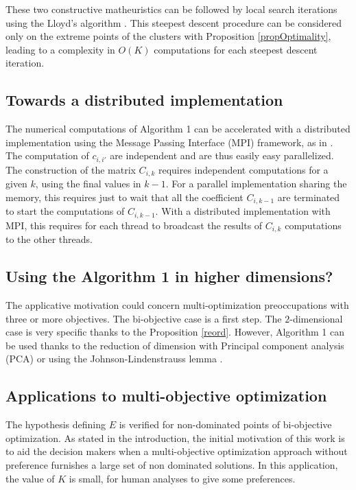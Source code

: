 \documentclass{meta}
\begin{document}
These two constructive matheuristics can be followed by local search iterations
using the Lloyd's algorithm \cite{lloyd1982least}.
This steepest descent procedure can be considered only on the extreme points of the clusters
 with Proposition  \ref{propOptimality},
 leading to a complexity in  $O(K)$ computations for each steepest descent iteration. 


\subsection{Towards a distributed implementation}
 The numerical computations of Algorithm 1 can be accelerated with
a distributed implementation using the 
Message Passing Interface (MPI) framework, as in \cite{nielsen2016introduction}.
The computation of  $c_{i,i'}$ are independent and are thus easily easy parallelized. %
The construction of the matrix $C_{i,k}$ requires independent computations for a given $k$, using
the final values in $k-1$.
For a parallel implementation sharing the memory, this requires just to wait that all the 
coefficient $C_{i,k-1}$ are terminated to start the computations of $C_{i,k-1}$.
With a distributed implementation with MPI, this requires for each thread to broadcast  the 
results of $C_{i,k}$ computations to the other threads.

\subsection{Using the Algorithm 1 in higher dimensions?}
The applicative motivation could concern multi-optimization preoccupations with three or more objectives.
The bi-objective case is a first step.
The $2$-dimensional case is very specific thanks to  the Proposition \ref{reord}.
However, Algorithm 1 can be used thanks to the
reduction of dimension with Principal component analysis (PCA)
or using the Johnson-Lindenstrauss lemma \cite{dasgupta2003elementary}.

\subsection{Applications to multi-objective optimization}
The hypothesis defining $E$ is verified for non-dominated points of bi-objective optimization.
As stated in the introduction, the initial motivation of this work is to aid the decision makers
when a  multi-objective optimization approach without preference furnishes a large set of non dominated solutions.
In this application, the value of $K$ is small, for  human analyses to give some preferences.
\end{document}
